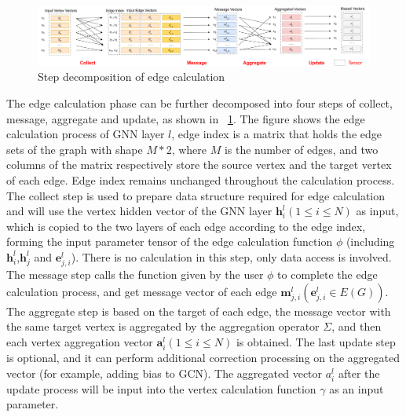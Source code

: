 \begin{figure}
    \centering
    \includegraphics[width=1\columnwidth]{figs/illustration/steps_in_edge_calculation.png}
    \caption{Step decomposition of edge calculation}
    \label{fig:steps_in_edge_calculation}
\end{figure}

The edge calculation phase can be further decomposed into four steps of collect, message, aggregate and update,
as shown in \figurename~\ref{fig:steps_in_edge_calculation}. The figure shows the edge calculation process of GNN layer $l$,
edge index is a matrix that holds the edge sets of the graph with shape $M*2$, where $M$ is the number of edges,
and two columns of the matrix respectively store the source vertex and the target vertex of each edge.
Edge index remains unchanged throughout the calculation process.
The collect step is used to prepare data structure required for edge calculation and will use the vertex hidden vector of the GNN layer $\boldsymbol{h}_i^l (1 \leq i \leq N)$
as input, which is copied to the two layers of each edge according to the edge index, forming the input parameter tensor of the edge calculation function $\phi$
(including $\boldsymbol{h}_i^l$,$\boldsymbol{h}_j^ l$ and $\boldsymbol{e}_{j, i}^l$).
There is no calculation in this step, only data access is involved.
The message step calls the function given by the user $\phi$ to complete the edge calculation process, and get message vector of each edge $\boldsymbol{m}_{j, i}^l (\boldsymbol{e}_{j, i}^l \in E(G))$.
The aggregate step is based on the target of each edge, the message vector with the same target vertex is aggregated by the aggregation operator $\Sigma$,
and then each vertex aggregation vector $\boldsymbol{a}_i^l (1 \leq i \leq N)$ is obtained.
The last update step is optional, and it can perform additional correction processing on the aggregated vector (for example, adding bias to GCN).
The aggregated vector $a_i^l$ after the update process will be input into the vertex calculation function $\gamma$ as an input parameter.

